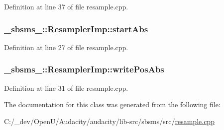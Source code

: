 Definition at line 37 of file resample.\+cpp.

\subsubsection[{\texorpdfstring{start\+Abs}{startAbs}}]{ \+\_\+sbsms\+\_\+\+::\+Resampler\+Imp\+::start\+Abs\hspace{0.3cm}{\ttfamily [protected]}}\hypertarget{class__sbsms___1_1_resampler_imp_a268200edd9d2395c6200be673b00a10c}{}\label{class__sbsms___1_1_resampler_imp_a268200edd9d2395c6200be673b00a10c}


Definition at line 27 of file resample.\+cpp.

\subsubsection[{\texorpdfstring{write\+Pos\+Abs}{writePosAbs}}]{ \+\_\+sbsms\+\_\+\+::\+Resampler\+Imp\+::write\+Pos\+Abs\hspace{0.3cm}{\ttfamily [protected]}}\hypertarget{class__sbsms___1_1_resampler_imp_a833e3e7d22aaa1322fa676b0a170beab}{}\label{class__sbsms___1_1_resampler_imp_a833e3e7d22aaa1322fa676b0a170beab}


Definition at line 31 of file resample.\+cpp.



The documentation for this class was generated from the following file\+:\begin{DoxyCompactItemize}
\item 
C\+:/\+\_\+dev/\+Open\+U/\+Audacity/audacity/lib-\/src/sbsms/src/\hyperlink{lib-src_2sbsms_2src_2resample_8cpp}{resample.\+cpp}\end{DoxyCompactItemize}

